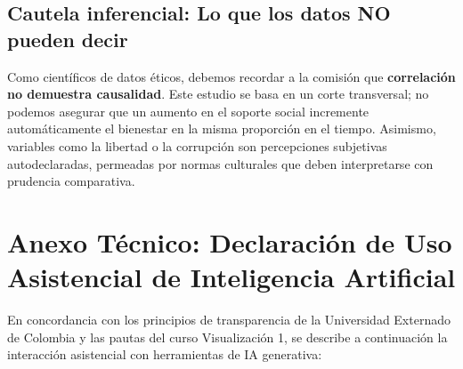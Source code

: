 \documentclass[9.5pt, a4paper]{article}
\begin{document}
\subsection{Cautela inferencial: Lo que los datos NO pueden decir}
Como científicos de datos éticos, debemos recordar a la comisión que \textbf{correlación no demuestra causalidad}. Este estudio se basa en un corte transversal; no podemos asegurar que un aumento en el soporte social incremente automáticamente el bienestar en la misma proporción en el tiempo. Asimismo, variables como la libertad o la corrupción son percepciones subjetivas autodeclaradas, permeadas por normas culturales que deben interpretarse con prudencia comparativa.

\clearpage

\section*{Anexo Técnico: Declaración de Uso Asistencial de Inteligencia Artificial}
\small
En concordancia con los principios de transparencia de la Universidad Externado de Colombia y las pautas del curso Visualización 1, se describe a continuación la interacción asistencial con herramientas de IA generativa:
\end{document}
